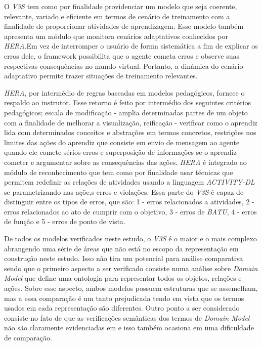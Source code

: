 O \textit{V3S} tem como por finalidade providenciar um modelo que seja coerente, relevante, variado e eficiente em termos de cenário de treinamento com a finalidade de proporcionar atividades de aprendizagem. Esse modelo também apresenta um módulo que monitora cenários adaptativos conhecidos por \textit{HERA}.Em vez de interromper o usuário de forma sistemática a fim de explicar os erros dele, o framework possibilita que o agente cometa erros e observe suas respectivas consequências no mundo virtual. Portanto, a dinâmica do cenário adaptativo permite trazer situações de treinamento relevantes. 

\textit{HERA}, por intermédio de regras baseadas em modelos pedagógicos, fornece o respaldo ao instrutor. Esse retorno é feito por intermédio dos seguintes critérios pedagógicos; escala de modificação - amplia determinadas partes de um objeto com a finalidade de melhorar a visualização, reificação - verificar como o aprendiz lida com determinados conceitos e abstrações em termos concretos, restrições nos limites das ações do aprendiz que consiste em envio de mensagem ao agente quando ele comete sérios erros e superposição de informações se o aprendiz cometer e argumentar sobre as consequências das ações. \textit{HERA} é integrado ao módulo de reconhecimento que tem como por finalidade usar técnicas que permitem redefinir as relações de atividades usando a linguagem \textit{ACTIVITY-DL} se parametrizando nas açõe,s erros e violações. Essa parte do \textit{V3S} é capaz de distinguir entre os tipos de erros, que são: 1 - erros relacionados a atividades, 2 - erros relacionados ao ato de cumprir com o objetivo, 3 - erros de \textit{BATU}, 4 - erros de função e 5 - erros de ponto de vista.

De todos os modelos verificados neste estudo, o \textit{V3S} é o maior e o mais complexo abrangendo uma série de áreas que não está no escopo da representação em construção neste estudo. Isso não tira um potencial para análise comparativa sendo que o primeiro aspecto a ser verificado consiste numa análise sobre \textit{Domain Model} que define uma ontologia para representar todos os objetos, relações e ações. Sobre esse aspecto, ambos modelos possuem estruturas que se assemelham, mas a essa comparação é um tanto prejudicada tendo em vista que os termos usados em cada representação são diferentes. Outro ponto a ser considerado consiste no fato de que as verificações semânticas dos termos de \textit{Domain Model} não são claramente evidenciadas em \cite{v3sframework} e isso também ocasiona em uma dificuldade de comparação. 


